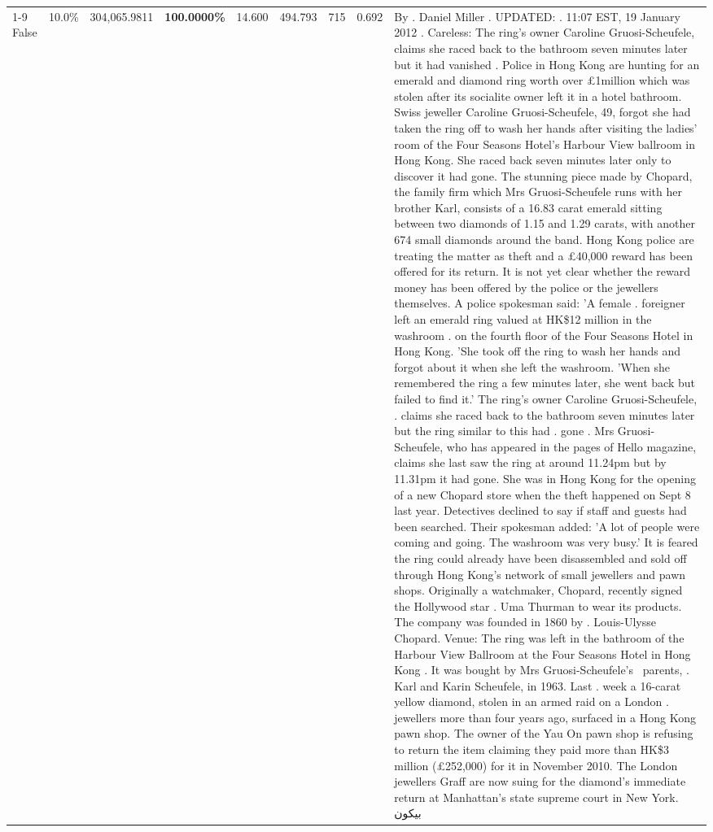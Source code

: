 \begin{table}[H]
\begin{tabular}{lllrlllll}
\cline{1-9}
False & 10.0\% & 304,065.9811 & \bfseries \color{red} 100.0000\% & 14.600 & 494.793 & 715 & 0.692 & By . Daniel Miller . UPDATED: . 11:07 EST, 19 January 2012 . Careless: The ring's owner Caroline Gruosi-Scheufele, claims she raced back to the bathroom seven minutes later but it had vanished . Police in Hong Kong are hunting for an emerald and diamond ring worth over £1million which was stolen after its socialite owner left it in a hotel bathroom. Swiss jeweller Caroline Gruosi-Scheufele, 49, forgot she had taken the ring off to wash her hands after visiting the ladies' room of the Four Seasons Hotel's Harbour View ballroom in Hong Kong. She raced back seven minutes later only to discover it had gone. The stunning piece made by Chopard, the family firm which Mrs Gruosi-Scheufele runs with her brother Karl, consists of a 16.83 carat emerald sitting between two diamonds of 1.15 and 1.29 carats, with another 674 small diamonds around the band. Hong Kong police are treating the matter as theft and a £40,000 reward has been offered for its return. It is not yet clear whether the reward money has been offered by the police or the jewellers themselves. A police spokesman said: 'A female . foreigner left an emerald ring valued at HK\$12 million in the washroom . on the fourth floor of the Four Seasons Hotel in Hong Kong. 'She took off the ring to wash her hands and forgot about it when she left the washroom. 'When she remembered the ring a few minutes later, she went back but failed to find it.' The ring's owner Caroline Gruosi-Scheufele, . claims she raced back to the bathroom seven minutes later but the ring similar to this had . gone . Mrs Gruosi-Scheufele, who has appeared in the pages of Hello magazine, claims she last saw the ring at around 11.24pm but by 11.31pm it had gone. She was in Hong Kong for the opening of a new Chopard store when the theft happened on Sept 8 last year. Detectives declined to say if staff and guests had been searched. Their spokesman added: 'A lot of people were coming and going. The washroom was very busy.' It is feared the ring could already have been disassembled and sold off through Hong Kong's network of small jewellers and pawn shops. Originally a watchmaker, Chopard, recently signed the Hollywood star . Uma Thurman to wear its products. The company was founded in 1860 by . Louis-Ulysse Chopard. Venue: The ring was left in the bathroom of the Harbour View Ballroom at the Four Seasons Hotel in Hong Kong . It was bought by Mrs Gruosi-Scheufele's  parents, . Karl and Karin Scheufele, in 1963. Last . week a 16-carat yellow diamond, stolen in an armed raid on a London . jewellers more than four years ago, surfaced in a Hong Kong pawn shop. The owner of the Yau On pawn shop is refusing to return the item claiming they paid more than HK\$3 million (£252,000) for it in November 2010. The London jewellers Graff are now suing for the diamond’s immediate return at Manhattan’s state supreme court in New York. بيكون \\

\end{tabular}
\end{table}
